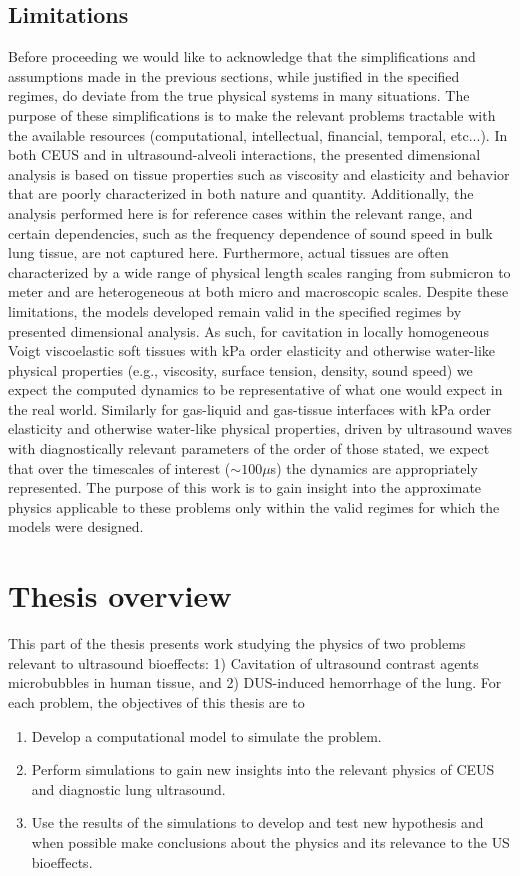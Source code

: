 \subsection{Limitations} 
Before proceeding we would like to acknowledge that the
simplifications and assumptions made in the previous sections, while
justified in the specified regimes, do deviate from the true physical
systems in many situations. The purpose of these simplifications is to
make the relevant problems tractable with the available resources
(computational, intellectual, financial, temporal, etc...). In both
\ac{CEUS} and in ultrasound-alveoli interactions, the presented
dimensional analysis is based on tissue properties such as viscosity
and elasticity and behavior that are poorly characterized in both
nature and quantity. Additionally, the analysis performed here is for
reference cases within the relevant range, and certain dependencies,
such as the frequency dependence of sound speed in bulk lung tissue,
are not captured here. Furthermore, actual tissues are often
characterized by a wide range of physical length scales ranging from
submicron to meter and are heterogeneous at both micro and
macroscopic scales. Despite these limitations, the models developed
remain valid in the specified regimes by presented dimensional
analysis. As such, for cavitation in locally homogeneous Voigt
viscoelastic soft tissues with kPa order elasticity and otherwise
water-like physical properties (e.g., viscosity, surface tension,
density, sound speed) we expect the computed dynamics to be
representative of what one would expect in the real world. Similarly
for gas-liquid and gas-tissue interfaces with kPa order elasticity and
otherwise water-like physical properties, driven by ultrasound waves
with diagnostically relevant parameters of the order of those stated,
we expect that over the timescales of interest ($\sim100 \mu$s) the
dynamics are appropriately represented. The purpose of this work is to
gain insight into the approximate physics applicable to these problems
only within the valid regimes for which the models were designed.
 
\section{Thesis overview}
This part of the thesis presents work studying the physics of two
problems relevant to ultrasound bioeffects: 1) Cavitation of
ultrasound contrast agents microbubbles in human tissue, and 2)
\ac{DUS}-induced hemorrhage of the lung. For each problem, the
objectives of this thesis are to
\begin{enumerate}
\item Develop a computational model to simulate the problem.
\item Perform simulations to gain new insights into the relevant
  physics of \ac{CEUS} and diagnostic lung ultrasound.
\item Use the results of the simulations to develop and test new
  hypothesis and when possible make conclusions about the physics and
  its relevance to the \ac{US} bioeffects.
\end{enumerate}

